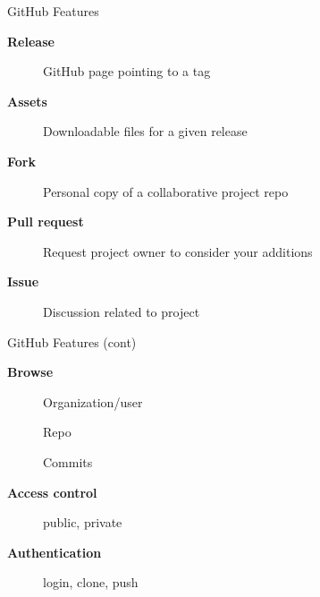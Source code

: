 \documentclass[aspectratio=169]{beamer}
\begin{document}



\begin{frame}{GitHub Features}\small
  \begin{description}
    \item[\bf\darkblue Release] GitHub page pointing to a tag
    \\[5ex]
    \item[\bf\darkblue Assets] Downloadable files for a given release
    \\[5ex]
    \item[\bf\darkblue Fork] Personal copy of a collaborative project repo
    \\[5ex]
    \item[\bf\darkblue Pull request] Request project owner to consider your
    additions \\[5ex]
    \item[\bf\darkblue Issue] Discussion related to project 
  \end{description}
\end{frame}


\begin{frame}{GitHub Features (cont)}\small
  \begin{description}
    \item[\bf\darkblue Browse] Organization/user \\[3ex]
    \item[] Repo \\[3ex]
    \item[] Commits \\[6ex]
    \item[\bf\darkblue Access control] public, private
    \\[6ex]
    \item[\bf\darkblue Authentication] login, clone, push \\[2ex]
  \end{description}
\end{frame}
\end{document}
